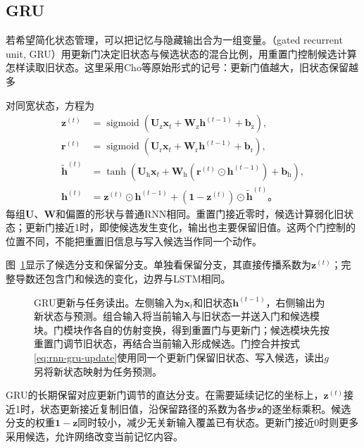 \subsection{GRU}
\label{sec:rnn-gru}

若希望简化状态管理，可以把记忆与隐藏输出合为一组变量。（gated recurrent unit, GRU）用更新门决定旧状态与候选状态的混合比例，用重置门控制候选计算怎样读取旧状态。这里采用Cho等原始形式的记号：更新门值越大，旧状态保留越多

对同宽状态，方程为
\begin{equation}
  \begin{aligned}
    \bm{z}^{(t)}&=\operatorname{sigmoid}\!\left(
      \bm{U}_{\mathrm{z}}\bm{x}_t+\bm{W}_{\mathrm{z}}\bm{h}^{(t-1)}
      +\bm{b}_{\mathrm{z}}\right),\\
    \bm{r}^{(t)}&=\operatorname{sigmoid}\!\left(
      \bm{U}_{\mathrm{r}}\bm{x}_t+\bm{W}_{\mathrm{r}}\bm{h}^{(t-1)}
      +\bm{b}_{\mathrm{r}}\right),\\
    \widetilde{\bm{h}}^{(t)}&=\tanh\!\left(
      \bm{U}_{\mathrm{h}}\bm{x}_t
      +\bm{W}_{\mathrm{h}}(\bm{r}^{(t)}\odot\bm{h}^{(t-1)})
      +\bm{b}_{\mathrm{h}}\right),\\
    \bm{h}^{(t)}&=\bm{z}^{(t)}\odot\bm{h}^{(t-1)}
      +(\bm{1}-\bm{z}^{(t)})\odot\widetilde{\bm{h}}^{(t)}\text{。}
  \end{aligned}
  \label{eq:rnn-gru-update}
\end{equation}
每组$\bm{U}$、$\bm{W}$和偏置的形状与普通RNN相同。重置门接近零时，候选计算弱化旧状态；更新门接近1时，即使候选发生变化，输出也主要保留旧值。这两个门控制的位置不同，不能把重置旧信息与写入候选当作同一个动作。

图~\ref{fig:rnn-gru-cell}显示了候选分支和保留分支。单独看保留分支，其直接传播系数为$\bm{z}^{(t)}$；完整导数还包含门和候选的变化，边界与LSTM相同。

\begin{figure}[htb]
  \centering
  
  \caption{GRU更新与任务读出。左侧输入为$\bm x_t$和旧状态$\bm h^{(t-1)}$，右侧输出为新状态与预测。组合输入将当前输入与旧状态一并送入门和候选模块。门模块作各自的仿射变换，得到重置门与更新门；候选模块先按重置门调节旧状态，再结合当前输入形成候选。门控合并按式\eqref{eq:rnn-gru-update}使用同一个更新门保留旧状态、写入候选，读出$g$另将新状态映射为任务预测。}
  \label{fig:rnn-gru-cell}
\end{figure}

GRU的长期保留对应更新门调节的直达分支。在需要延续记忆的坐标上，$\bm z^{(t)}$接近1时，状态更新接近复制旧值，沿保留路径的系数为各步$\bm z$的逐坐标乘积。候选分支的权重$\bm1-\bm z$同时较小，减少无关新输入覆盖已有状态。更新门接近0时则更多采用候选，允许网络改变当前记忆内容。

